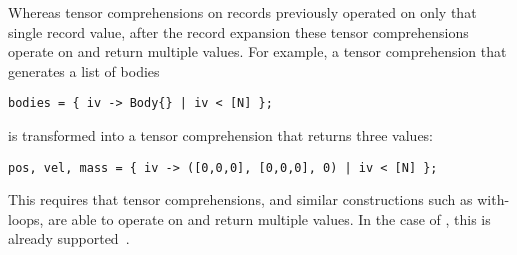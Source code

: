 Whereas tensor comprehensions on records previously operated on only that single record value, after the record expansion these tensor comprehensions operate on and return multiple values.
For example, a tensor comprehension that generates a list of bodies
%
\begin{lstlisting}
bodies = { iv -> Body{} | iv < [N] };
\end{lstlisting}
%
is transformed into a tensor comprehension that returns three values:
%
\begin{lstlisting}
pos, vel, mass = { iv -> ([0,0,0], [0,0,0], 0) | iv < [N] };
\end{lstlisting}
%
This requires that tensor comprehensions, and similar constructions such as with-loops, are able to operate on and return multiple values.
In the case of \sac{}, this is already supported~\cite{sac-scan}.
